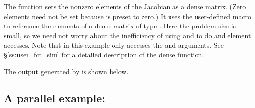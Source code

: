 The function  sets the nonzero elements of the Jacobian
as a dense matrix.  (Zero elements need not be set because 
is preset to zero.)  It uses the user-defined macro
to reference the elements of a dense matrix of type .
Here the problem size is small, so we need not worry about the
inefficiency of using  and  to do
 and  element accesses.
Note that in this example  only accesses the  and  arguments.
See \S\ref{ss:user_fct_sim} for a detailed description of the dense  function.

The output generated by  is shown below.


\subsection{A parallel example: }\label{ss:kinwebbbd}

